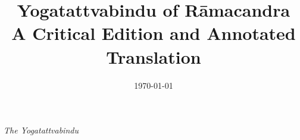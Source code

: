 %
%


\title{Yogatattvabindu of Rāmacandra\\ A Critical Edition and Annotated Translation}
\date{\today}

\parindent=15pt



\frontmatter
\thispagestyle{empty}
\begin{center}
  {\Large \emph{The Yogatattvabindu}}\\[3mm]
\end{center}



